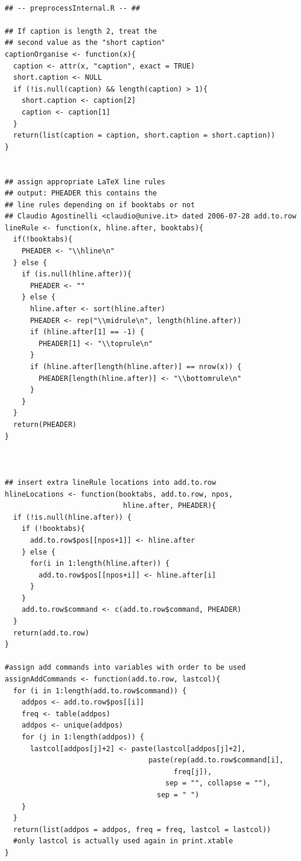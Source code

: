 \documentclass{memoir}\usepackage[]{graphicx}\usepackage[]{color}
\begin{document}
\begin{lstlisting}

## -- preprocessInternal.R -- ##

## If caption is length 2, treat the 
## second value as the "short caption"
captionOrganise <- function(x){
  caption <- attr(x, "caption", exact = TRUE)
  short.caption <- NULL
  if (!is.null(caption) && length(caption) > 1){
    short.caption <- caption[2]
    caption <- caption[1]
  }
  return(list(caption = caption, short.caption = short.caption))
}


## assign appropriate LaTeX line rules
## output: PHEADER this contains the 
## line rules depending on if booktabs or not
## Claudio Agostinelli <claudio@unive.it> dated 2006-07-28 add.to.row
lineRule <- function(x, hline.after, booktabs){
  if(!booktabs){
    PHEADER <- "\\hline\n"
  } else {
    if (is.null(hline.after)){
      PHEADER <- ""
    } else {
      hline.after <- sort(hline.after)
      PHEADER <- rep("\\midrule\n", length(hline.after))
      if (hline.after[1] == -1) {
        PHEADER[1] <- "\\toprule\n"
      }
      if (hline.after[length(hline.after)] == nrow(x)) {
        PHEADER[length(hline.after)] <- "\\bottomrule\n"
      }
    }  
  }
  return(PHEADER)
}



## insert extra lineRule locations into add.to.row
hlineLocations <- function(booktabs, add.to.row, npos, 
                            hline.after, PHEADER){
  if (!is.null(hline.after)) {
    if (!booktabs){
      add.to.row$pos[[npos+1]] <- hline.after
    } else {
      for(i in 1:length(hline.after)) {
        add.to.row$pos[[npos+i]] <- hline.after[i]
      }
    }
    add.to.row$command <- c(add.to.row$command, PHEADER)
  }
  return(add.to.row)
}

#assign add commands into variables with order to be used
assignAddCommands <- function(add.to.row, lastcol){
  for (i in 1:length(add.to.row$command)) {
    addpos <- add.to.row$pos[[i]]
    freq <- table(addpos)
    addpos <- unique(addpos)
    for (j in 1:length(addpos)) {
      lastcol[addpos[j]+2] <- paste(lastcol[addpos[j]+2],
                                  paste(rep(add.to.row$command[i],
                                        freq[j]),
                                      sep = "", collapse = ""),
                                    sep = " ")
    }
  }
  return(list(addpos = addpos, freq = freq, lastcol = lastcol))
  #only lastcol is actually used again in print.xtable
}

\end{lstlisting}
\end{document}
